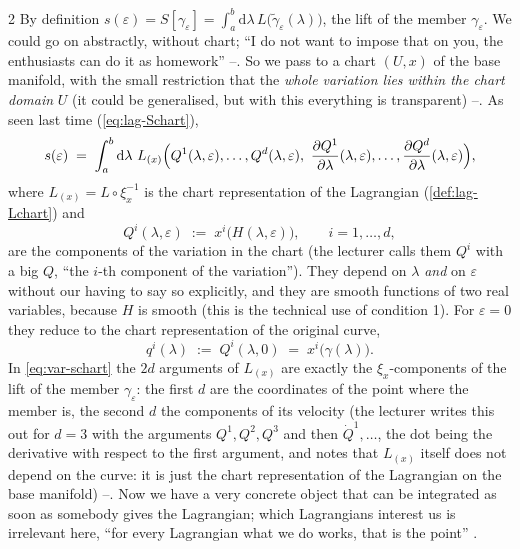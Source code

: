 \begin{paracol}{2}
By definition $s(\varepsilon)=S[\gamma_\varepsilon]=\int_a^b\mathrm d\lambda\,L\bigl(\tilde\gamma_\varepsilon(\lambda)\bigr)$, the lift of the member $\gamma_\varepsilon$. We could go on abstractly, without chart; ``I do not want to impose that on you, the enthusiasts can do it as homework'' --. So we pass to a chart $(U,x)$ of the base manifold, with the small restriction that the \emph{whole variation lies within the chart domain} $U$ (it could be generalised, but with this everything is transparent) --. As seen last time (\eqref{eq:lag-Schart}),
\begin{equation}\label{eq:var-schart}
  s(\varepsilon)\;=\;\int_a^b\mathrm d\lambda\ L_{(x)}\Bigl(Q^1(\lambda,\varepsilon),\dots,Q^d(\lambda,\varepsilon),\ \frac{\partial Q^1}{\partial\lambda}(\lambda,\varepsilon),\dots,\frac{\partial Q^d}{\partial\lambda}(\lambda,\varepsilon)\Bigr),
\end{equation}
where $L_{(x)}=L\circ\xi_x^{-1}$ is the chart representation of the Lagrangian (\cref{def:lag-Lchart}) and
\begin{equation}\label{eq:var-Q}
  Q^i(\lambda,\varepsilon)\;:=\;x^i\bigl(H(\lambda,\varepsilon)\bigr),\qquad i=1,\dots,d,
\end{equation}
are the components of the variation in the chart (the lecturer calls them $Q^i$ with a big $Q$, ``the $i$-th component of the variation''). They depend on $\lambda$ \emph{and} on $\varepsilon$ without our having to say so explicitly, and they are smooth functions of two real variables, because $H$ is smooth (this is the technical use of condition 1). For $\varepsilon=0$ they reduce to the chart representation of the original curve,
\begin{equation}\label{eq:var-q}
  q^i(\lambda)\;:=\;Q^i(\lambda,0)\;=\;x^i\bigl(\gamma(\lambda)\bigr).
\end{equation}
In \eqref{eq:var-schart} the $2d$ arguments of $L_{(x)}$ are exactly the $\xi_x$-components of the lift of the member $\gamma_\varepsilon$: the first $d$ are the coordinates of the point where the member is, the second $d$ the components of its velocity (the lecturer writes this out for $d=3$ with the arguments $Q^1,Q^2,Q^3$ and then $\dot Q^1,\dots$, the dot being the derivative with respect to the first argument, and notes that $L_{(x)}$ itself does not depend on the curve: it is just the chart representation of the Lagrangian on the base manifold) --. Now we have a very concrete object that can be integrated as soon as somebody gives the Lagrangian; which Lagrangians interest us is irrelevant here, ``for every Lagrangian what we do works, that is the point'' .


\end{paracol}
